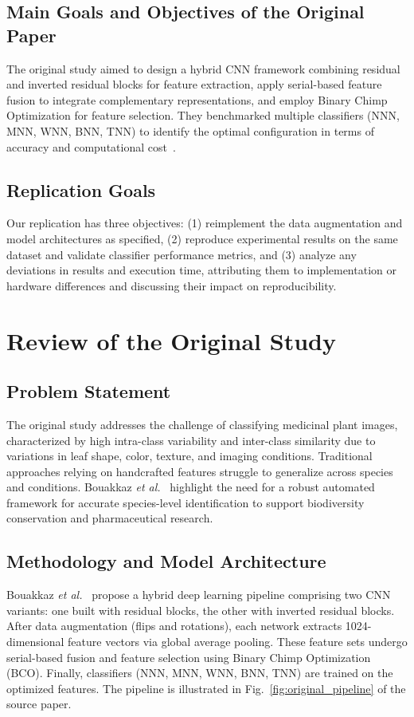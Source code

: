 \documentclass[journal,onecolumn]{IEEEtran}
\begin{document}
\subsection{Main Goals and Objectives of the Original Paper}
The original study aimed to design a hybrid CNN framework combining residual and inverted residual blocks for feature extraction, apply serial-based feature fusion to integrate complementary representations, and employ Binary Chimp Optimization for feature selection. They benchmarked multiple classifiers (NNN, MNN, WNN, BNN, TNN) to identify the optimal configuration in terms of accuracy and computational cost~\cite{KaggleDataset}.

\subsection{Replication Goals}
Our replication has three objectives: (1) reimplement the data augmentation and model architectures as specified, (2) reproduce experimental results on the same dataset and validate classifier performance metrics, and (3) analyze any deviations in results and execution time, attributing them to implementation or hardware differences and discussing their impact on reproducibility.

\section{Review of the Original Study}
\subsection{Problem Statement}
The original study addresses the challenge of classifying medicinal plant images, characterized by high intra-class variability and inter-class similarity due to variations in leaf shape, color, texture, and imaging conditions. Traditional approaches relying on handcrafted features struggle to generalize across species and conditions. Bouakkaz \textit{et al.}~\cite{Bouakkaz2025} highlight the need for a robust automated framework for accurate species-level identification to support biodiversity conservation and pharmaceutical research.

\subsection{Methodology and Model Architecture}
Bouakkaz \textit{et al.}~\cite{Bouakkaz2025} propose a hybrid deep learning pipeline comprising two CNN variants: one built with residual blocks, the other with inverted residual blocks. After data augmentation (flips and rotations), each network extracts 1024-dimensional feature vectors via global average pooling. These feature sets undergo serial-based fusion and feature selection using Binary Chimp Optimization (BCO). Finally, classifiers (NNN, MNN, WNN, BNN, TNN) are trained on the optimized features. The pipeline is illustrated in Fig.~\ref{fig:original_pipeline} of the source paper.
\end{document}
